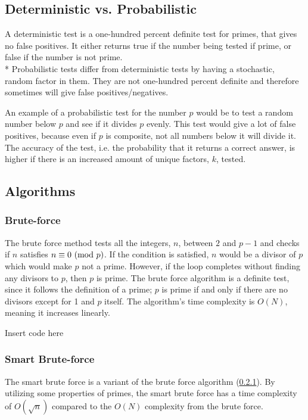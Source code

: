 \documentclass[main.tex]{subfiles}
\begin{document}
\subsection{Deterministic vs. Probabilistic}
A deterministic test is a one-hundred percent definite test for primes, that
gives no false positives. It either returns true if the number being tested if
prime, or false if the number is not prime. \newline
\\*
Probabilistic tests differ from deterministic tests by having a stochastic,
random factor in them. They are not one-hundred percent definite and therefore
sometimes will give false positives/negatives.

An example of a probabilistic test for the number $p$ would be to test a random
number below $p$ and see if it divides $p$ evenly. This test would give a lot of
false positives, because even if $p$ is composite, not all numbers below it will
divide it. The accuracy of the test, i.e. the probability that it returns a
correct answer, is higher if there is an increased amount of unique factors,
$k$, tested.

\subsection{Algorithms}

\subsubsection{Brute-force} \label{brute} The brute force method tests all the
integers, $n$, between $2$ and $p-1$ and checks if $n$ satisfies $n \equiv 0
\ (\mathrm{mod}\ p)$. If the condition is satisfied, $n$ would be a divisor of $p$ which
would make $p$ not a prime. However, if the loop completes without finding any
divisors to $p$, then $p$ is prime. The brute force algorithm is a definite
test, since it follows the definition of a prime; $p$ is prime if and only if
there are no divisors except for 1 and $p$ itself. The algorithm's time
complexity is $O(N)$, meaning it increases linearly. \newline

\begin{python}
  Insert code here
\end{python}

\subsubsection{Smart Brute-force}
The smart brute force is a variant of the brute force algorithm (\ref{brute}).
By utilizing some properties of primes, the smart brute force has a time
complexity of $O(\sqrt{n})$ compared to the $O(N)$ complexity from the brute
force.
\end{document}
